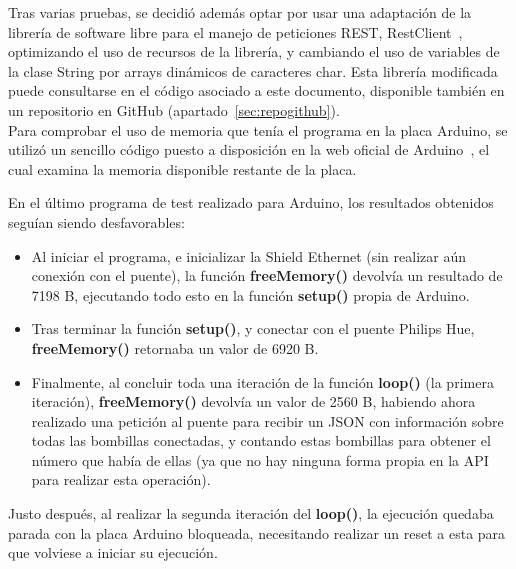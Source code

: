        Tras varias pruebas, se decidió además optar por usar una adaptación de la librería de software libre para el manejo de peticiones REST, RestClient~\cite{restclientgit}, optimizando el uso de recursos de la librería, y cambiando el uso de variables de la clase String por arrays dinámicos de caracteres char. Esta librería modificada puede consultarse en el código asociado a este documento, disponible también en un repositorio en GitHub (apartado~\ref{sec:repogithub}). \\

        Para comprobar el uso de memoria que tenía el programa en la placa Arduino, se utilizó un sencillo código puesto a disposición en la web oficial de Arduino~\cite{memoryfreearduino}\cite{memoryfreegit}, el cual examina la memoria disponible restante de la placa. \\

        \vspace{0.3cm}

        En el último programa de test realizado para Arduino, los resultados obtenidos seguían siendo desfavorables:
        \begin{itemize}
            \item Al iniciar el programa, e inicializar la Shield Ethernet (sin realizar aún conexión con el puente), la función \textbf{freeMemory()} devolvía un resultado de 7198 B, ejecutando todo esto en la función \textbf{setup()} propia de Arduino.
            \item Tras terminar la función \textbf{setup()}, y conectar con el puente Philips Hue,  \textbf{freeMemory()} retornaba un valor de 6920 B.
            \item Finalmente, al concluir toda una iteración de la función \textbf{loop()} (la primera iteración), \textbf{freeMemory()} devolvía un valor de 2560 B, habiendo ahora realizado una petición al puente para recibir un JSON con información sobre todas las bombillas conectadas, y contando estas bombillas para obtener el número que había de ellas (ya que no hay ninguna forma propia en la API para realizar esta operación).
        \end{itemize}

        Justo después, al realizar la segunda iteración del \textbf{loop()}, la ejecución quedaba parada con la placa Arduino bloqueada, necesitando realizar un reset a esta para que volviese a iniciar su ejecución. \\

